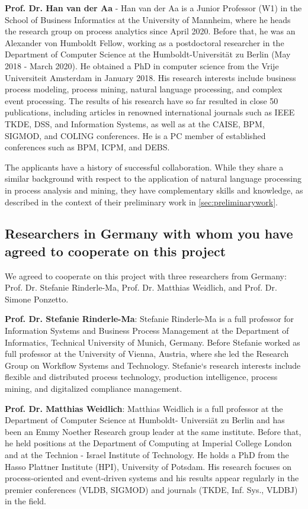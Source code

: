 \textbf{Prof. Dr. Han van der Aa} - Han van der Aa is a Junior Professor (W1) in the School of Business Informatics at the University of Mannheim, where he heads the research group on process analytics since April 2020. Before that, he was an Alexander von Humboldt Fellow, working as a postdoctoral researcher in the Department of Computer Science at the Humboldt-Universität zu Berlin (May 2018 - March 2020). He obtained a PhD in computer science from the Vrije Universiteit Amsterdam in January 2018. His research interests include business process modeling, process mining, natural language processing, and complex event processing. 
The results of his research have so far resulted in close 50 publications, including articles in 
renowned international journals such as IEEE TKDE, DSS, and Information Systems, as well as at the CAISE, BPM, SIGMOD, and COLING conferences.
He is a PC member of established conferences such as BPM, ICPM, and DEBS.


The applicants have a history of successful collaboration. While they share a similar background with respect to the application of natural language processing in process analysis and mining, they  have complementary skills and knowledge, as described in the context of their preliminary work in \autoref{sec:preliminarywork}.

\subsection{Researchers in Germany with whom you have agreed to cooperate on this project}
\label{sec:collab:germany}

We agreed to cooperate on this project with three researchers from Germany: Prof. Dr. Stefanie Rinderle-Ma, Prof. Dr. Matthias Weidlich, and Prof. Dr. Simone Ponzetto. 

\textbf{Prof. Dr. Stefanie Rinderle-Ma}: Stefanie Rinderle-Ma is a full professor for Information Systems and Business Process Management at the Department of Informatics, Technical University of Munich, Germany. Before Stefanie worked as full professor at the University of Vienna, Austria, where she led the Research Group on Workflow Systems and Technology. Stefanie‘s research interests include flexible and distributed process technology, production intelligence, process mining, and digitalized compliance management.
 
\textbf{Prof. Dr. Matthias Weidlich}: Matthias Weidlich is a full professor at the Department of Computer Science at Humboldt- Universi\"at zu Berlin and has been an Emmy Noether Research group leader at the same institute. Before that, he held positions at the Department of Computing at Imperial College London and at the Technion - Israel Institute of Technology. He holds a PhD from the Hasso Plattner Institute (HPI), University of Potsdam. His research focuses on process-oriented and event-driven systems and his results appear regularly in the premier conferences (VLDB, SIGMOD) and journals (TKDE, Inf. Sys., VLDBJ) in the field.

